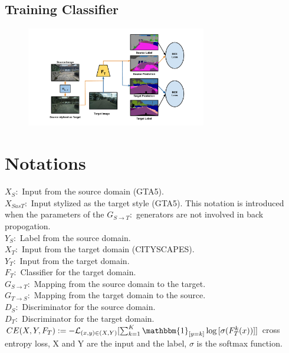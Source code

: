 \documentclass{article}
\begin{document}
\subsection{Training Classifier}
\begin{figure}[H]
    \centering
\includegraphics[width=0.7\textwidth]{figures/c_t.pdf}
\end{figure}

\section{Notations}
$X_S: $ Input from the source domain (GTA5).\\
$X_{SasT}: $ Input stylized as the target style (GTA5). This notation is introduced when the parameters of the $G_{S\rightarrow T}:$ generators are not involved in back propogation. \\
$Y_S: $ Label from the source domain. \\
$X_T: $ Input from the target domain (CITYSCAPES).\\
$Y_T: $ Input from the target domain.\\
$F_T: $ Classifier for the target domain.\\
$G_{S\rightarrow T}: $ Mapping from the source domain to the target.\\
$G_{T\rightarrow S}: $ Mapping from the target domain to the source.\\
$D_S:$ Discriminator for the source domain.\\
$D_T:$ Discriminator for the target domain.\\
$CE(X, Y, F_T): = -\mathcal{L}_{(x,y) \in (X,Y)}{[\sum_{k=1}^{K} \mathbbm{1}_{[y=k]} \log{[\sigma (F_T^{k}(x))]} ]}$ cross entropy loss, X and Y are the input and the label, $\sigma$ is the softmax function.
\end{document}

